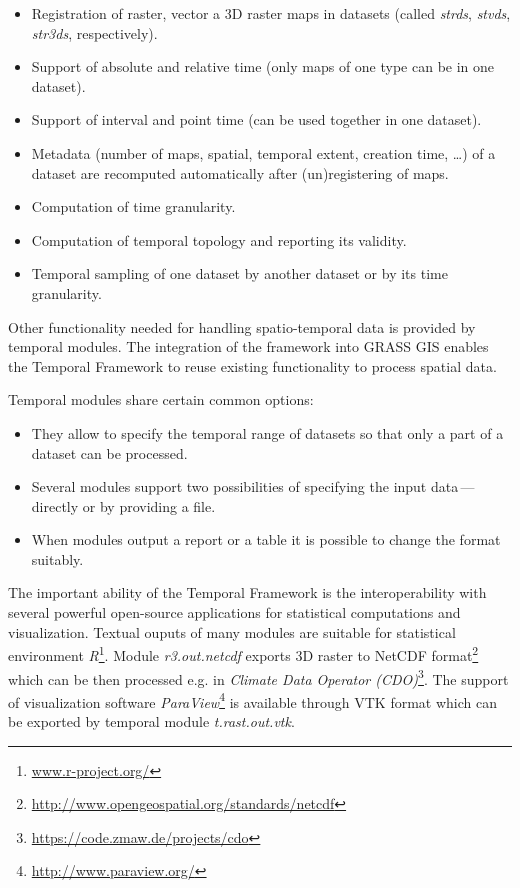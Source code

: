 \documentclass[a4paper,12pt]{book}
\newcommand{\module}[1]{\textsl{#1}}
\newcommand{\tf}{Temporal Framework\xspace}
\begin{document}
\begin{itemize}
    \item Registration of raster, vector a 3D raster maps in datasets (called \emph{strds}, \emph{stvds}, \emph{str3ds}, respectively).
    \item Support of absolute and relative time (only maps of one type can be in one dataset).
    \item Support of interval and point time (can be used together in one dataset).
    \item Metadata (number of maps, spatial, temporal extent, creation time, \ldots) of a dataset
    are recomputed automatically after (un)registering of maps.
    \item Computation of time granularity.
    \item Computation of temporal topology and reporting its validity.
    \item Temporal sampling of one dataset by another dataset or by its time granularity.
\end{itemize}

Other functionality needed for handling spatio-temporal data is provided by temporal modules.
The integration of the framework into GRASS GIS enables the \tf to reuse existing
functionality to process spatial data.

Temporal modules share certain common options:
\begin{itemize}
  \item They allow to specify the temporal range of datasets so that only a part of a dataset can be processed.
  \item Several modules support two possibilities of specifying the input data\,---\,directly or by providing a file.
  \item When modules output a report or a table it is possible to change the format suitably.
\end{itemize}

The important ability of the \tf is the interoperability
with several powerful open-source applications for statistical computations and visualization.
Textual ouputs of many modules are suitable for statistical environment \emph{R}\footnote{\url{www.r-project.org/}}.
Module \module{r3.out.netcdf} exports 3D raster to NetCDF
format\footnote{\url{http://www.opengeospatial.org/standards/netcdf}}
which can be then processed e.g. in \emph{Climate Data Operator (CDO)}\footnote{\url{https://code.zmaw.de/projects/cdo}}.
The support of visualization software \emph{ParaView}\footnote{\url{http://www.paraview.org/}} is available
through VTK format which can be exported by temporal module \module{t.rast.out.vtk}.
\end{document}

